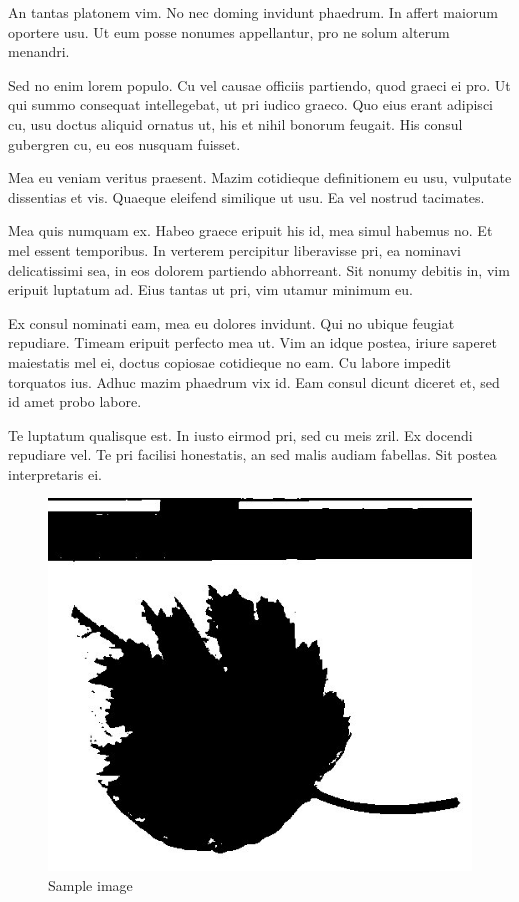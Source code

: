 \documentclass{article}
\begin{document}
An tantas platonem vim. No nec doming invidunt phaedrum. In affert maiorum oportere usu. Ut eum posse nonumes appellantur, pro ne solum alterum menandri.

Sed no enim lorem populo. Cu vel causae officiis partiendo, quod graeci ei pro. Ut qui summo consequat intellegebat, ut pri iudico graeco. Quo eius erant adipisci cu, usu doctus aliquid ornatus ut, his et nihil bonorum feugait. His consul gubergren cu, eu eos nusquam fuisset.

Mea eu veniam veritus praesent. Mazim cotidieque definitionem eu usu, vulputate dissentias et vis. Quaeque eleifend similique ut usu. Ea vel nostrud tacimates.

Mea quis numquam ex. Habeo graece eripuit his id, mea simul habemus no. Et mel essent temporibus. In verterem percipitur liberavisse pri, ea nominavi delicatissimi sea, in eos dolorem partiendo abhorreant. Sit nonumy debitis in, vim eripuit luptatum ad. Eius tantas ut pri, vim utamur minimum eu.

Ex consul nominati eam, mea eu dolores invidunt. Qui no ubique feugiat repudiare. Timeam eripuit perfecto mea ut. Vim an idque postea, iriure saperet maiestatis mel ei, doctus copiosae cotidieque no eam. Cu labore impedit torquatos ius. Adhuc mazim phaedrum vix id. Eam consul dicunt diceret et, sed id amet probo labore.

Te luptatum qualisque est. In iusto eirmod pri, sed cu meis zril. Ex docendi repudiare vel. Te pri facilisi honestatis, an sed malis audiam fabellas. Sit postea interpretaris ei.
\begin{figure}[ht]
\centering
\includegraphics[width = 0.9\linewidth]{images/leaf.png}
\caption{Sample image}
\end{figure}




\end{document}
